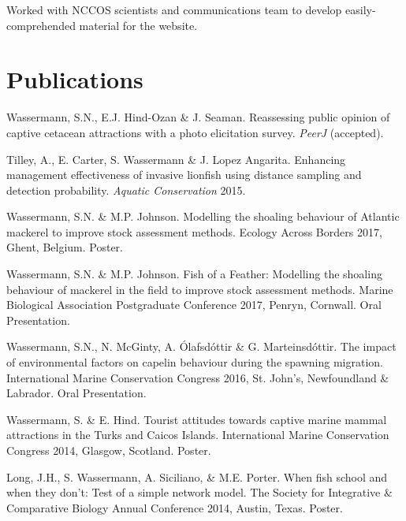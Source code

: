 \documentclass[a4paper]{deedy-resume} %
\begin{document}
\begin{flushleft}


Worked with NCCOS scientists and communications team to develop easily-comprehended material for the website.

\sectionspace 
\sectionspace



\section{Publications} 

\begin{tightitemize}
\item Wassermann, S.N., E.J. Hind-Ozan \& J. Seaman. 
Reassessing public opinion of captive cetacean attractions with a photo elicitation survey. \textit{PeerJ} (accepted).
\item Tilley, A., E. Carter, S. Wassermann \& J. Lopez Angarita. Enhancing management effectiveness of invasive lionfish using distance sampling and detection probability. \textit{Aquatic Conservation} 2015.
\end{tightitemize}

\sectionspace

\begin{tightitemize}
\item Wassermann, S.N. \& M.P. Johnson. Modelling the shoaling behaviour of Atlantic mackerel to improve stock assessment methods. Ecology Across Borders 2017, Ghent, Belgium. Poster.
\item Wassermann, S.N. \& M.P. Johnson. Fish of a Feather: Modelling the shoaling behaviour of mackerel in the field to improve stock assessment methods. Marine Biological Association Postgraduate Conference 2017, Penryn, Cornwall. Oral Presentation.
\item Wassermann, S.N., N. McGinty, A. Ólafsdóttir \& G. Marteinsdóttir. The impact of environmental factors on capelin behaviour during the spawning migration. International Marine Conservation Congress 2016, St. John's, Newfoundland \& Labrador. Oral Presentation.
\item Wassermann, S. \& E. Hind. Tourist attitudes towards captive marine mammal attractions in the Turks and Caicos Islands. International Marine Conservation Congress 2014, Glasgow, Scotland. Poster.
\item Long, J.H., S. Wassermann, A. Siciliano, \& M.E. Porter. When fish school and when they don't: Test of a simple network model. The Society for Integrative \& Comparative Biology Annual Conference 2014, Austin, Texas. Poster.
\end{tightitemize}


\end{flushleft}
\end{document}
